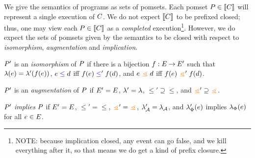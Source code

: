 We give the semantics of programs as sets of pomsets.  Each pomset
$P\in\llbracket C\rrbracket$ will represent a single execution of $C$.  We do not
expect $\llbracket C\rrbracket$ to be prefixed closed; thus, one may view each
$P\in\llbracket C\rrbracket$ as a \emph{completed} execution\footnote{NOTE: because
  implication closed, any event can go false, and we kill everything after
  it, so that means we do get a kind of prefix closure.}.  However, we do
expect the sets of pomsets given by the semantics to be closed with respect
to \emph{isomorphism}, \emph{augmentation} and \emph{implication}.
\begin{definition}
  $P'$ is an \emph{isomorphism} of $P$ if there is a bijection
  $f:E\mathbin\rightarrow E'$ such that $\lambda(e)=\lambda'(f(e))$,
  $e\mathrel{{\color{blue}\leq}}d$ iff $f(e)\mathrel{{\color{blue}\leq}}'f(d)$, and $\aEv\gtN\bEv$ iff
  $f(\aEv)\gtN'f(\bEv)$.

  $P'$ is an \emph{augmentation} of $P$ if $E'=E$,
  ${\lambda'}={\lambda}$, ${\le'}\supseteq{\le}$, and
  ${\gtN'}\supseteq{\gtN}$.

  $P'$ \emph{implies} $P$ if $E'=E$, ${\le'}={\le}$,
  ${\gtN'}={\gtN}$, $\lambda_{\mathcal{A}}'=\lambda_{\mathcal{A}}$, and $\lambda_{\Phi}'(e)$
  implies $\lambda_{\Phi}(e)$ for all $e\in E$.
\end{definition}





